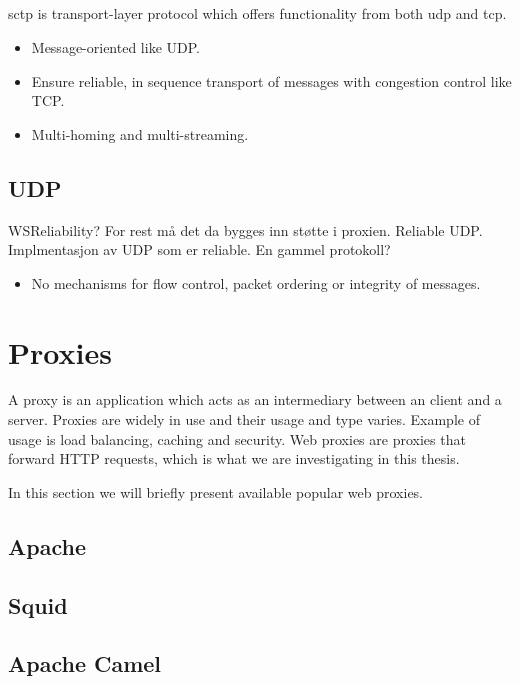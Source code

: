 \subsection{}

\gls{sctp} is transport-layer protocol which offers functionality from both \gls{udp} and \gls{tcp}.
\begin{itemize}
    \item Message-oriented like UDP.
    \item Ensure reliable, in sequence transport of messages with congestion control like TCP.
    \item Multi-homing and multi-streaming.
\end{itemize}



\subsection{UDP}
WSReliability? For rest må det da bygges inn støtte i proxien.
Reliable UDP. Implmentasjon av UDP som er reliable. En gammel protokoll?
\begin{itemize}
    \item No mechanisms for flow control, packet ordering or integrity of
    messages.
\end{itemize}

\section{Proxies}

A proxy is an application which acts as an intermediary between an client and a
server. Proxies are widely in use and their usage and type varies. Example of
usage is load balancing, caching and security. Web proxies are proxies that
forward HTTP requests, which is what we are investigating in this thesis.

In this section we will briefly present available popular web proxies.

\subsection{Apache}

\subsection{Squid}

\subsection{Apache Camel}

